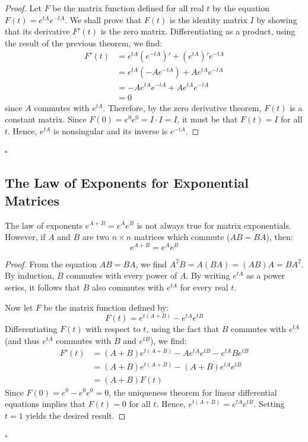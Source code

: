 \documentclass[12pt,a4paper]{report}
\theoremstyle{definition}
\numberwithin{equation}{chapter}
\begin{document}
\begin{proof}
Let $F$ be the matrix function defined for all real $t$ by the equation $F(t) = e^{tA}e^{-tA}$. We shall prove that $F(t)$ is the identity matrix $I$ by showing that its derivative $F'(t)$ is the zero matrix. Differentiating as a product, using the result of the previous theorem, we find:
\begin{equation}
\begin{aligned}
F'(t) &= e^{tA}(e^{-tA})' + (e^{tA})'e^{-tA} \\
      &= e^{tA}(-Ae^{-tA}) + Ae^{tA}e^{-tA} \\
      &= -Ae^{tA}e^{-tA} + Ae^{tA}e^{-tA} \\
      &= 0
\end{aligned}
\end{equation}
since $A$ commutes with $e^{tA}$. Therefore, by the zero derivative theorem, $F(t)$ is a constant matrix. Since $F(0) = e^0 e^0 = I \cdot I = I$, it must be that $F(t) = I$ for all $t$. Hence, $e^{tA}$ is nonsingular and its inverse is $e^{-tA}$.
\end{proof}
\hfill $\square$

\subsection*{The Law of Exponents for Exponential Matrices}
The law of exponents $e^{A+B} = e^A e^B$ is not always true for matrix exponentials. However, if $A$ and $B$ are two $n \times n$ matrices which commute ($AB = BA$), then:
\begin{equation}
e^{A+B} = e^A e^B
\end{equation}

\begin{proof}
From the equation $AB = BA$, we find $A^2 B = A(BA) = (AB)A = BA^2$. By induction, $B$ commutes with every power of $A$. By writing $e^{tA}$ as a power series, it follows that $B$ also commutes with $e^{tA}$ for every real $t$.

Now let $F$ be the matrix function defined by:
\begin{equation}
F(t) = e^{t(A+B)} - e^{tA}e^{tB}
\end{equation}
Differentiating $F(t)$ with respect to $t$, using the fact that $B$ commutes with $e^{tA}$ (and thus $e^{tA}$ commutes with $B$ and $e^{tB}$), we find:
\begin{equation}
\begin{aligned}
F'(t) &= (A+B)e^{t(A+B)} - Ae^{tA}e^{tB} - e^{tA} B e^{tB} \\
      &= (A+B)e^{t(A+B)} - (A+B)e^{tA}e^{tB} \\
      &= (A+B)F(t)
\end{aligned}
\end{equation}
Since $F(0) = e^0 - e^0 e^0 = 0$, the uniqueness theorem for linear differential equations implies that $F(t) = 0$ for all $t$. Hence, $e^{t(A+B)} = e^{tA}e^{tB}$. Setting $t=1$ yields the desired result.
\end{proof}
\hfill $\square$
\end{document}
